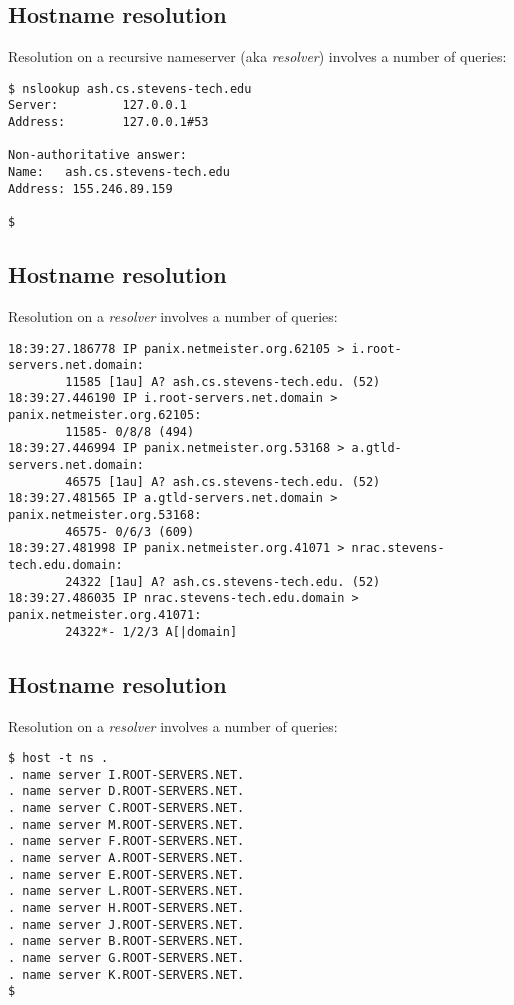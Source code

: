 \documentclass[xga]{xdvislides}
\begin{document}
\subsection{Hostname resolution}
Resolution on a recursive nameserver (aka {\em resolver}) involves a number of queries:
\vspace{.5in}
\begin{verbatim}
$ nslookup ash.cs.stevens-tech.edu
Server:         127.0.0.1
Address:        127.0.0.1#53

Non-authoritative answer:
Name:   ash.cs.stevens-tech.edu
Address: 155.246.89.159

$
\end{verbatim}

\subsection{Hostname resolution}
Resolution on a {\em resolver} involves a number of queries:
\begin{verbatim}
18:39:27.186778 IP panix.netmeister.org.62105 > i.root-servers.net.domain:
        11585 [1au] A? ash.cs.stevens-tech.edu. (52)
18:39:27.446190 IP i.root-servers.net.domain > panix.netmeister.org.62105:
        11585- 0/8/8 (494)
18:39:27.446994 IP panix.netmeister.org.53168 > a.gtld-servers.net.domain:
        46575 [1au] A? ash.cs.stevens-tech.edu. (52)
18:39:27.481565 IP a.gtld-servers.net.domain > panix.netmeister.org.53168:
        46575- 0/6/3 (609)
18:39:27.481998 IP panix.netmeister.org.41071 > nrac.stevens-tech.edu.domain:
        24322 [1au] A? ash.cs.stevens-tech.edu. (52)
18:39:27.486035 IP nrac.stevens-tech.edu.domain > panix.netmeister.org.41071:
        24322*- 1/2/3 A[|domain]
\end{verbatim}
\Normalsize

\subsection{Hostname resolution}
Resolution on a {\em resolver} involves a number of queries:
\begin{verbatim}
$ host -t ns .
. name server I.ROOT-SERVERS.NET.
. name server D.ROOT-SERVERS.NET.
. name server C.ROOT-SERVERS.NET.
. name server M.ROOT-SERVERS.NET.
. name server F.ROOT-SERVERS.NET.
. name server A.ROOT-SERVERS.NET.
. name server E.ROOT-SERVERS.NET.
. name server L.ROOT-SERVERS.NET.
. name server H.ROOT-SERVERS.NET.
. name server J.ROOT-SERVERS.NET.
. name server B.ROOT-SERVERS.NET.
. name server G.ROOT-SERVERS.NET.
. name server K.ROOT-SERVERS.NET.
$
\end{verbatim}
\end{document}
